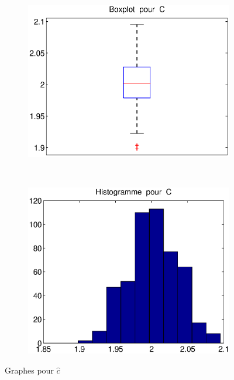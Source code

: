 \begin{figure}[!ht]
        \centering
        \begin{subfigure}[b]{0.4\textwidth}
                \includegraphics[width=\textwidth]{graphes/boxplot_cmg.eps}
        \end{subfigure}%
        ~
        \begin{subfigure}[b]{0.4\textwidth}
                \includegraphics[width=\textwidth]{graphes/hist_cmg.eps}
        \end{subfigure}
        \caption{Graphes pour $\hat{c}$}\label{fig:cmg}
\end{figure}

